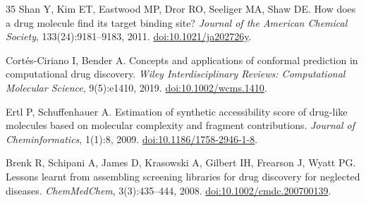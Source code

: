 \documentclass[11pt]{article}
\begin{document}
\begin{thebibliography}{35}
Shan Y, Kim ET, Eastwood MP, Dror RO, Seeliger MA, Shaw DE.
How does a drug molecule find its target binding site?
\textit{Journal of the American Chemical Society}, 133(24):9181--9183, 2011.
\href{https://doi.org/10.1021/ja202726y}{doi:10.1021/ja202726y}.

Cort\'es-Ciriano I, Bender A.
Concepts and applications of conformal prediction in computational drug discovery.
\textit{Wiley Interdisciplinary Reviews: Computational Molecular Science}, 9(5):e1410, 2019.
\href{https://doi.org/10.1002/wcms.1410}{doi:10.1002/wcms.1410}.

Ertl P, Schuffenhauer A.
Estimation of synthetic accessibility score of drug-like molecules based on molecular complexity and fragment contributions.
\textit{Journal of Cheminformatics}, 1(1):8, 2009.
\href{https://doi.org/10.1186/1758-2946-1-8}{doi:10.1186/1758-2946-1-8}.

Brenk R, Schipani A, James D, Krasowski A, Gilbert IH, Frearson J, Wyatt PG.
Lessons learnt from assembling screening libraries for drug discovery for neglected diseases.
\textit{ChemMedChem}, 3(3):435--444, 2008.
\href{https://doi.org/10.1002/cmdc.200700139}{doi:10.1002/cmdc.200700139}.

\end{thebibliography}
\end{document}
